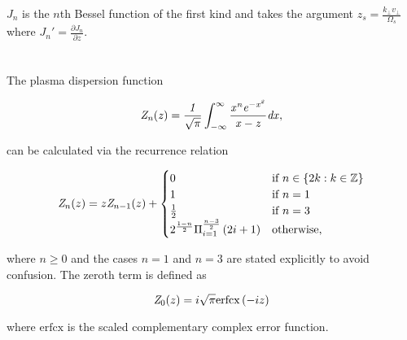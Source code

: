 \documentclass[12pt]{iopart}
\begin{document}
$J_n$ is the $n$th Bessel function of the first kind and takes the argument $z_s=\frac{k_\perp v_\perp}{\Omega_s}$ where $J_n'=\frac{\partial J_n}{\partial z}$.

\section{}

The plasma dispersion function\cite{Fried1961}

\begin{equation}
\it{Z}_n(z)=\frac{1}{\sqrt{\pi}}\int_{-\infty}^{\infty}\frac{x^n e^{-x^2}}{x-z}dx,
\end{equation}

can be calculated via the recurrence relation\cite{Sampoorna2007}

\begin{equation}
{\it Z}_n(z) = z {\it Z}_{n-1}(z) + \begin{cases}
0 & \text{if } n \in \{2k : k \in \mathbb{Z}\}
\\
1 & \text{if } n = 1
\\
\frac{1}{2} & \text{if } n = 3
\\
2^{\frac{1-n}{2}} \Pi_{i=1}^{\frac{n-3}{2}} \left( 2i + 1 \right) & \text{otherwise},
\end{cases}
\end{equation}

where $n \geq 0$ and the cases $n=1$ and $n=3$ are stated explicitly to avoid confusion. The zeroth term is defined as

\begin{equation}
 {\it Z}_0(z) = i \sqrt{\pi} \mathrm{erfcx} \left(-i z \right)
\end{equation}

where $\mathrm{erfcx}$ is the scaled complementary complex error function.

\newpage



\end{document}
